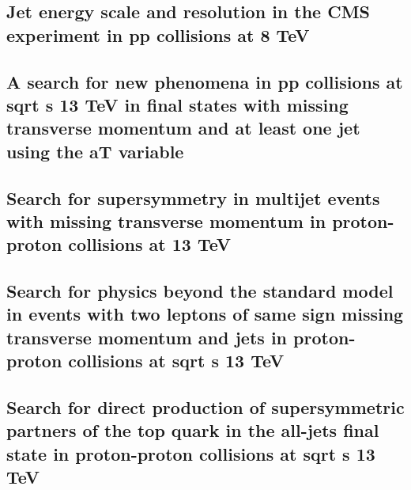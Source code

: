 \documentclass[a4paper, 11pt, twoside, openright]{report}
\begin{document}
\subsection{Jet energy scale and resolution in the CMS experiment in pp collisions at 8 TeV}


\subsection{A search for new phenomena in pp collisions at sqrt s 13 TeV in final states with missing transverse momentum and at least one jet using the aT variable}


\subsection{Search for supersymmetry in multijet events with missing transverse momentum in proton-proton collisions at 13 TeV}


\subsection{Search for physics beyond the standard model in events with two leptons of same sign missing transverse momentum and jets in proton-proton collisions at sqrt s 13 TeV}


\subsection{Search for direct production of supersymmetric partners of the top quark in the all-jets final state in proton-proton collisions at sqrt s 13 TeV}

\end{document}
